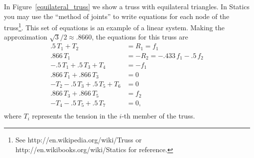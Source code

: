 In Figure~\ref{equilateral_truss} we show a truss with equilateral
triangles. In Statics you may use the ``method of joints'' to write
equations for each node of the truss\footnote{See
  http://en.wikipedia.org/wiki/Truss or
  http://en.wikibooks.org/wiki/Statics for reference.}.  This set of
equations is an example of a linear system.  Making the approximation
$\sqrt{3}/2 \approx .8660$, the equations for this truss are
\begin{equation}
\label{truss_equilateral_eqns}
\begin{split}
  .5 \, T_1 + T_2 & = R_1 = f_1 \\
  .866 \, T_1 & = - R_2 = -.433 \, f_1 - .5 \, f_2 \\
  -.5 \, T_1 + .5 \, T_3 + T_4 &= - f_1 \\
  .866 \, T_1 + .866 \, T_3 &= 0 \\
  -T_2 - .5 \, T_3 + .5 \, T_5 + T_6 &= 0 \\
  .866 \, T_3 + .866 \, T_5 &= f_2 \\
  -T_4 - .5 \, T_5 + .5 \, T_7 &=0, \\
\end{split}
\end{equation}
where $T_i$ represents the tension in the $i$-th member of the truss.
%



